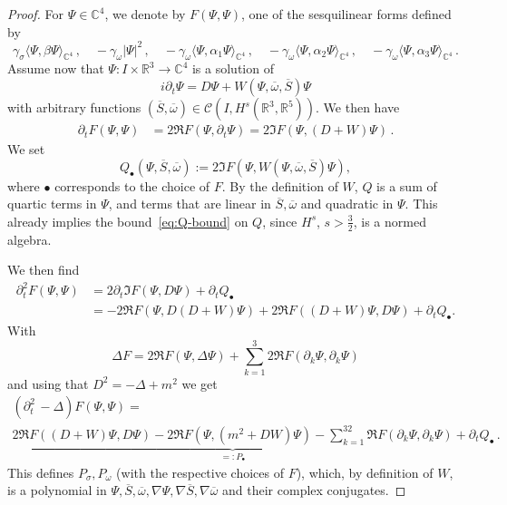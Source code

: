 \documentclass[AHL,Unicode,longabstracts,published]{cedram}
\newcommand{\cC}{\mathcal{C}}
\newcommand\R{\mathbb{R}}
\newcommand\C{\mathbb{C}}
\begin{document}
\begin{proof}
For $\Psi\in\C^4$, we denote by $F(\Psi, \Psi)$, one of the sesquilinear forms defined by
\[
\gamma_\sigma\langle \Psi, \beta\Psi\rangle_{\C^4}\,,\quad -\gamma_\omega|\Psi|^2\,,\quad -\gamma_\omega\langle\Psi, \alpha_1\Psi\rangle_{\C^4}\,,\quad -\gamma_\omega\langle\Psi, \alpha_2\Psi\rangle_{\C^4}\,,\quad -\gamma_\omega\langle\Psi, \alpha_3\Psi\rangle_{\C^4}\,.
\]
Assume now that $\Psi:I \times \R^3 \to \C^4 $ is a solution of
\begin{equation}\label{eqPsiW}
i\partial_t \Psi=D \Psi + W(\Psi,\overline{\omega},\overline{S}) \Psi
\end{equation}
with arbitrary functions $(\overline{S}, \overline{\omega})\in \cC(I, H^{s}(\R^3,\R^5))$. We then have
\[
\begin{split}
\partial_t F(\Psi,\Psi) &= 2\Re F(\Psi,\partial_t\Psi) = 2 \Im F(\Psi, (D + W) \Psi) \,.
\end{split}
\]
We set
\begin{equation}\label{eq:Q def}
Q_\bullet(\Psi, \overline{S}, \overline{\omega}):=2\Im F(\Psi, W(\Psi,\overline{\omega},\overline{S})\Psi),
\end{equation}
where $\bullet$ corresponds to the choice of $F$. By the definition of $W$, $Q$ is a sum of quartic terms in $\Psi$, and terms that are linear in $\overline{S}, \overline{\omega}$ and quadratic in $\Psi$. This already implies the bound~\eqref{eq:Q-bound} on $Q$, since $H^s$, $s>\tfrac32$, is a normed algebra.

We then find
\begin{align*}
\partial_t^2 F(\Psi,\Psi) & = 2\partial_t \Im F(\Psi, D \Psi) + \partial_t Q_\bullet \\
&= - 2 \Re F(\Psi, D (D+W) \Psi) + 2 \Re F((D+W)\Psi, D \Psi) + \partial_t Q_\bullet.
\end{align*}
With
\begin{equation*}
\Delta F = 2\Re F(\Psi, \Delta \Psi) + \sum_{k=1}^3 2 \Re F(\partial_k \Psi, \partial_k \Psi)
\end{equation*}
and using that $ D^2 = -\Delta+m^2 $ we get
\begin{multline*}
(\partial_t^2\,-\Delta)F(\Psi,\Psi) =\\
 \underbrace{2\Re F((D+W)\Psi,D\Psi) -2\Re F\left(\Psi,(m^2+ D W)\Psi\right) -\sum_{k=1}^32\Re F(\partial_k\Psi,\partial_k\Psi)}_{=:P_\bullet} + \partial_t Q_\bullet\,.
\end{multline*}
This defines $P_\sigma, P_\omega$ (with the respective choices of $F$), which, by definition of $W$, is a polynomial in $\Psi, \overline{S}, \overline{\omega}, \nabla\Psi, \nabla \overline{S}, \nabla \overline{\omega}$ and their complex conjugates.


\end{proof}
\end{document}
